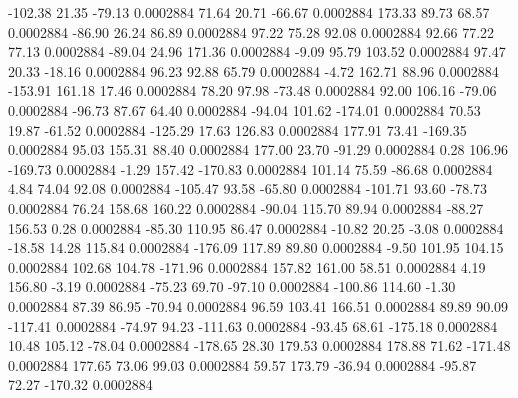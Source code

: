      -102.38       21.35      -79.13     0.0002884
       71.64       20.71      -66.67     0.0002884
      173.33       89.73       68.57     0.0002884
      -86.90       26.24       86.89     0.0002884
       97.22       75.28       92.08     0.0002884
       92.66       77.22       77.13     0.0002884
      -89.04       24.96      171.36     0.0002884
       -9.09       95.79      103.52     0.0002884
       97.47       20.33      -18.16     0.0002884
       96.23       92.88       65.79     0.0002884
       -4.72      162.71       88.96     0.0002884
     -153.91      161.18       17.46     0.0002884
       78.20       97.98      -73.48     0.0002884
       92.00      106.16      -79.06     0.0002884
      -96.73       87.67       64.40     0.0002884
      -94.04      101.62     -174.01     0.0002884
       70.53       19.87      -61.52     0.0002884
     -125.29       17.63      126.83     0.0002884
      177.91       73.41     -169.35     0.0002884
       95.03      155.31       88.40     0.0002884
      177.00       23.70      -91.29     0.0002884
        0.28      106.96     -169.73     0.0002884
       -1.29      157.42     -170.83     0.0002884
      101.14       75.59      -86.68     0.0002884
        4.84       74.04       92.08     0.0002884
     -105.47       93.58      -65.80     0.0002884
     -101.71       93.60      -78.73     0.0002884
       76.24      158.68      160.22     0.0002884
      -90.04      115.70       89.94     0.0002884
      -88.27      156.53        0.28     0.0002884
      -85.30      110.95       86.47     0.0002884
      -10.82       20.25       -3.08     0.0002884
      -18.58       14.28      115.84     0.0002884
     -176.09      117.89       89.80     0.0002884
       -9.50      101.95      104.15     0.0002884
      102.68      104.78     -171.96     0.0002884
      157.82      161.00       58.51     0.0002884
        4.19      156.80       -3.19     0.0002884
      -75.23       69.70      -97.10     0.0002884
     -100.86      114.60       -1.30     0.0002884
       87.39       86.95      -70.94     0.0002884
       96.59      103.41      166.51     0.0002884
       89.89       90.09     -117.41     0.0002884
      -74.97       94.23     -111.63     0.0002884
      -93.45       68.61     -175.18     0.0002884
       10.48      105.12      -78.04     0.0002884
     -178.65       28.30      179.53     0.0002884
      178.88       71.62     -171.48     0.0002884
      177.65       73.06       99.03     0.0002884
       59.57      173.79      -36.94     0.0002884
      -95.87       72.27     -170.32     0.0002884
